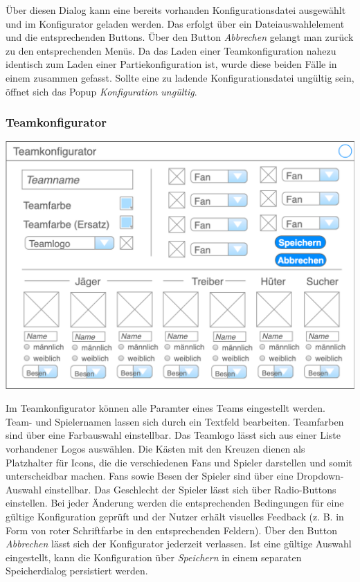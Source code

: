 \documentclass[a4paper,12pt,
headsepline,           %
oneside,               %
pointlessnumbers,      %
bibtotoc,              %
]{scrartcl}
\begin{document}
	Über diesen Dialog kann eine bereits vorhanden Konfigurationsdatei ausgewählt und im Konfigurator geladen werden. Das erfolgt über ein Dateiauswahlelement und die entsprechenden Buttons. Über den Button \textit{Abbrechen} gelangt man zurück zu den entsprechenden Menüs. Da das Laden einer Teamkonfiguration nahezu identisch zum Laden einer Partiekonfiguration ist, wurde diese beiden Fälle in einem zusammen gefasst. Sollte eine zu ladende Konfigurationsdatei ungültig sein, öffnet sich das Popup \textit{Konfiguration ungültig}.


	\subsubsection{Teamkonfigurator}
	
	\includegraphics[scale=0.4]{images/teamkonfigurator}
	
	Im Teamkonfigurator können alle Paramter eines Teams eingestellt werden. Team- und Spielernamen lassen sich durch ein Textfeld bearbeiten. Teamfarben sind über eine Farbauswahl einstellbar. Das Teamlogo lässt sich aus einer Liste vorhandener Logos auswählen. Die Kästen mit den Kreuzen dienen als Platzhalter für Icons, die die verschiedenen Fans und Spieler darstellen und somit unterscheidbar machen. Fans sowie Besen der Spieler sind über eine Dropdown-Auswahl einstellbar. Das Geschlecht der Spieler lässt sich über Radio-Buttons einstellen. Bei jeder Änderung werden die entsprechenden Bedingungen für eine gültige Konfiguration geprüft und der Nutzer erhält visuelles Feedback (z. B. in Form von roter Schriftfarbe in den entsprechenden Feldern). Über den Button \textit{Abbrechen} lässt sich der Konfigurator jederzeit verlassen. Ist eine gültige Auswahl eingestellt, kann die Konfiguration über \textit{Speichern} in einem separaten Speicherdialog persistiert werden.
	
\end{document}
